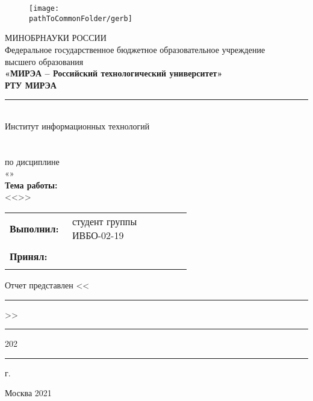
\begin{center}
	\begin{figure}[h!]
		\begin{center}
		\texttt{[image: \\pathToCommonFolder/gerb]}
		\end{center}	
	\end{figure}
 	\small	МИНОБРНАУКИ РОССИИ \\
	Федеральное государственное бюджетное образовательное учреждение\\
						высшего образования\\
\normalsize					
\textbf{«МИРЭА – Российский технологический университет»\\
						РТУ МИРЭА}\\
						\noindent\rule{1\linewidth}{1pt}\\
       Институт информационных технологий\\ %
					\kafedra\\
		\vspace{3ex}
			\large \textbf{\workname}  \\
						по дисциплине\\ «\discipline» \\
		\vspace{3ex}
		\if \withouttheme
			\textbf{Тема работы:}\\ <<\theme>>
		\fi
\vspace{6ex}
\small
\begin{table}[h!]
\begin{tabular}{lp{0.6\linewidth}l}
	\textbf{Выполнил:} & студент группы ИВБО-02-19 & \\ 
	& & \hfill \studentfio \\%
	\textbf{Принял:} & \rang & \\
	& & \hfill \teacherfio\\
\end{tabular}
\end{table}
\if \withoutsubmissiondate
\begin{flushleft}
	Отчет представлен <<\rule{3ex}{1pt}>>\rule{10ex}{1pt} 202\rule{1ex}{1pt} г.
\end{flushleft}
\fi
\normalsize
	
\vfill
Москва 2021

\end{center}